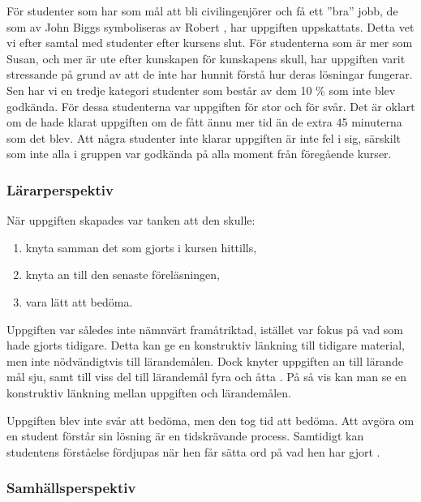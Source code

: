 \documentclass[a4paper, 10pt]{article}
\begin{document}
För studenter som har som mål att bli 
civilingenjörer och få ett ''bra'' jobb, 
de som av John Biggs symboliseras av Robert
\parencite[sida 16]{biggstang2022}, har 
uppgiften uppskattats. Detta vet vi efter 
samtal med studenter efter kursens slut.
För studenterna som är mer som Susan, och 
mer är ute efter kunskapen för kunskapens 
skull, har uppgiften varit stressande på 
grund av att de inte har hunnit förstå 
hur deras lösningar fungerar. Sen har vi en
tredje kategori studenter som består av 
dem 10 \% som inte blev godkända. För dessa 
studenterna var uppgiften för stor och 
för svår. Det är oklart om de hade 
klarat uppgiften om de fått ännu mer tid 
än de extra 45 minuterna som det blev. Att 
några studenter inte klarar uppgiften är 
inte fel i sig, särskilt som inte alla i 
gruppen var godkända på alla moment från 
föregående kurser.

\subsubsection{Lärarperspektiv}

När uppgiften skapades var tanken att den 
skulle:

\begin{enumerate}
   \item knyta samman det som gjorts i kursen hittills,
   \item knyta an till den senaste föreläsningen,
   \item vara lätt att bedöma.
\end{enumerate}

Uppgiften var således inte nämnvärt framåtriktad, 
istället var fokus på vad som hade gjorts 
tidigare. Detta kan ge en konstruktiv länkning 
till tidigare material, men inte nödvändigtvis 
till lärandemålen. Dock knyter uppgiften an till 
lärande mål sju, samt till viss del till 
lärandemål fyra och åtta \parencite{cd102a2025}.
På så vis kan man se en konstruktiv länkning 
mellan uppgiften och lärandemålen.

Uppgiften blev inte svår att bedöma, men den tog 
tid att bedöma. Att avgöra om en student förstår 
sin lösning är en tidskrävande process. Samtidigt
kan studentens förståelse fördjupas när hen 
får sätta ord på vad hen har gjort 
\parencite[sida 175]{elmgrenolding2025}.

\subsubsection{Samhällsperspektiv}
\end{document}
